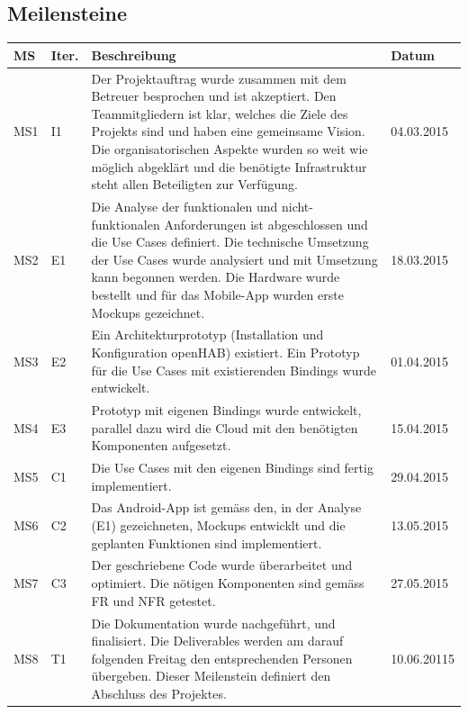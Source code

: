 	\subsection*{Meilensteine}
		\begin{tabularx}{\textwidth}{lp{1cm}Xl}
			\textbf{MS}	& \textbf{Iter.} & \textbf{Beschreibung} & \textbf{Datum}
			\\ \hline
				MS1 &
				I1 &
				Der Projektauftrag wurde zusammen mit dem Betreuer besprochen und ist akzeptiert. 
				Den Teammitgliedern ist klar, welches die Ziele des Projekts sind und haben eine gemeinsame Vision. 
				Die organisatorischen Aspekte wurden so weit wie möglich abgeklärt und die benötigte Infrastruktur 
				steht allen Beteiligten zur Verfügung. &
				04.03.2015
			\\ \hline		
				MS2 &
				E1 &
				Die Analyse der funktionalen und nicht-funktionalen Anforderungen ist abgeschlossen und die Use Cases definiert. 
				Die technische Umsetzung der Use Cases wurde analysiert und mit Umsetzung kann begonnen werden. Die Hardware wurde 
				bestellt und für das Mobile-App wurden erste Mockups gezeichnet. &
				18.03.2015
			\\ \hline
				MS3 &
				E2 &
				Ein Architekturprototyp (Installation und Konfiguration openHAB) existiert. Ein Prototyp für die Use Cases mit 
				existierenden Bindings wurde entwickelt.	& 01.04.2015
			\\ \hline
				MS4 &
				E3 &
				Prototyp mit eigenen Bindings wurde entwickelt, parallel dazu wird die Cloud mit den benötigten Komponenten aufgesetzt. &
				15.04.2015
			\\ \hline
 				MS5 &
 				C1 &
 				Die Use Cases mit den eigenen Bindings sind fertig implementiert. &
 				29.04.2015
 			\\ \hline
				MS6	&
				C2 &
				Das Android-App ist gemäss den, in der Analyse (E1) gezeichneten, Mockups entwicklt und die geplanten Funktionen sind implementiert. &
				13.05.2015
			\\ \hline
 				MS7 &
 				C3 &
 				Der geschriebene Code wurde überarbeitet und optimiert. Die nötigen Komponenten sind gemäss FR und NFR getestet. &
 				27.05.2015
 			\\ \hline
				MS8 &
				T1 &
				Die Dokumentation wurde nachgeführt, und finalisiert. Die Deliverables werden am darauf folgenden Freitag den entsprechenden 
				Personen übergeben. Dieser Meilenstein definiert den Abschluss des Projektes. &
				10.06.20115
			\\ \hline
		\end{tabularx}

